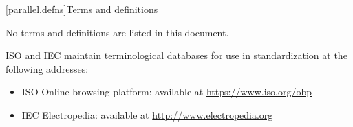 
[parallel.defns]{Terms and definitions}

\pnum
No terms and definitions are listed in this document.

\pnum
ISO and IEC maintain terminological databases for use in standardization at the following addresses:
\begin{itemize}
  \item ISO Online browsing platform: available at \url{https://www.iso.org/obp}
  \item IEC Electropedia: available at \url{http://www.electropedia.org}
\end{itemize}
